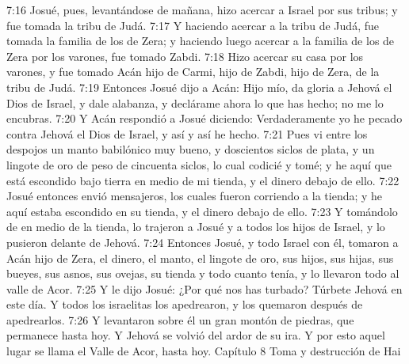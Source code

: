 7:16 Josué, pues, levantándose de mañana, hizo acercar a Israel por sus tribus; y fue tomada la tribu de Judá.  
7:17 Y haciendo acercar a la tribu de Judá, fue tomada la familia de los de Zera; y haciendo luego acercar a la familia de los de Zera por los varones, fue tomado Zabdi.  
7:18 Hizo acercar su casa por los varones, y fue tomado Acán hijo de Carmi, hijo de Zabdi, hijo de Zera, de la tribu de Judá.  
7:19 Entonces Josué dijo a Acán: Hijo mío, da gloria a Jehová el Dios de Israel, y dale alabanza, y declárame ahora lo que has hecho; no me lo encubras.  
7:20 Y Acán respondió a Josué diciendo: Verdaderamente yo he pecado contra Jehová el Dios de Israel, y así y así he hecho.  
7:21 Pues vi entre los despojos un manto babilónico muy bueno, y doscientos siclos de plata,  y un lingote de oro de peso de cincuenta siclos, lo cual codicié y tomé; y he aquí que está escondido bajo tierra en medio de mi tienda, y el dinero debajo de ello.  
7:22 Josué entonces envió mensajeros, los cuales fueron corriendo a la tienda; y he aquí estaba escondido en su tienda, y el dinero debajo de ello.  
7:23 Y tomándolo de en medio de la tienda, lo trajeron a Josué y a todos los hijos de Israel, y lo pusieron delante de Jehová. 
7:24 Entonces Josué, y todo Israel con él, tomaron a Acán hijo de Zera, el dinero, el manto, el lingote de oro, sus hijos, sus hijas, sus bueyes, sus asnos, sus ovejas, su tienda y todo cuanto tenía, y lo llevaron todo al valle de Acor.  
7:25 Y le dijo Josué: ¿Por qué nos has turbado? Túrbete Jehová en este día. Y todos los israelitas los apedrearon, y los quemaron después de apedrearlos.  
7:26 Y levantaron sobre él un gran montón de piedras, que permanece hasta hoy. Y Jehová se volvió del ardor de su ira. Y por esto aquel lugar se llama el Valle de Acor, hasta hoy.  
Capítulo 8
Toma y destrucción de Hai  

